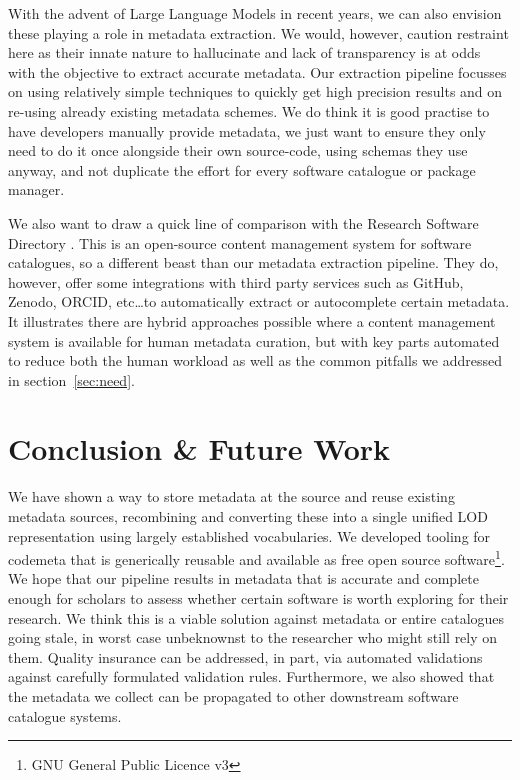 \documentclass[a4paper,11pt]{article}
\begin{document}
With the advent of Large Language Models in recent years, we can also envision
these playing a role in metadata extraction. We would, however, caution
restraint here as their innate nature to hallucinate and lack of transparency
is at odds with the objective to extract accurate metadata. Our extraction
pipeline focusses on using relatively simple techniques to quickly get high
precision results and on re-using already existing metadata schemes. We do
think it is good practise to have developers manually provide metadata, we just
want to ensure they only need to do it once alongside their own source-code,
using schemas they use anyway, and not duplicate the effort for every software
catalogue or package manager.

We also want to draw a quick line of comparison with the Research Software
Directory \citep{RSD, RSD2}. This is an open-source content management system
for software catalogues, so a different beast than our metadata extraction
pipeline. They do, however, offer some integrations with third party services
such as GitHub, Zenodo, ORCID, etc\ldots to automatically extract or
autocomplete certain metadata. It illustrates there are hybrid approaches
possible where a content management system is available for human metadata
curation, but with key parts automated to reduce both the human workload as well as 
the common pitfalls we addressed in
section~\ref{sec:need}.


\section{Conclusion \& Future Work}

We have shown a way to store metadata at the source and reuse existing metadata
sources, recombining and converting these into a single unified LOD
representation using largely established vocabularies. We developed tooling for
codemeta that is generically reusable and available as free open source
software\footnote{GNU General Public Licence v3}. We hope that our pipeline
results in metadata that is accurate and complete enough for scholars to assess
whether certain software is worth exploring for their research. We think this
is a viable solution against metadata or entire catalogues going stale, in
worst case unbeknownst to the researcher who might still rely on them. Quality
insurance can be addressed, in part, via automated validations against
carefully formulated validation rules. Furthermore, we also showed that the
metadata we collect can be propagated to other downstream software
catalogue systems.
\end{document}
